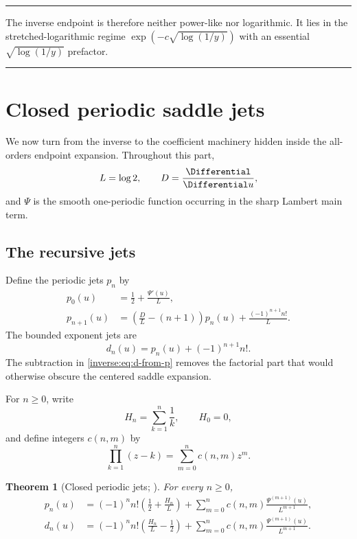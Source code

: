 \documentclass[11pt,oneside]{article}
\newtheorem{theorem}{Theorem}[section]
\theoremstyle{definition}
\theoremstyle{remark}
\newenvironment{boxedremark}{%
  \par\smallskip\noindent\begin{center}\begin{minipage}{0.94\textwidth}%
  \color{black}\hrule\vspace{0.6em}\small
}{%
  \vspace{0.6em}\hrule\end{minipage}\end{center}\smallskip
}
\begin{document}
\begin{boxedremark}
The inverse endpoint is therefore neither power-like nor logarithmic.
It lies in the stretched-logarithmic regime
$\exp(-c\sqrt{\log(1/y)})$ with an essential
$\sqrt{\log(1/y)}$ prefactor.
\end{boxedremark}

\section{Closed periodic saddle jets}
\label{inverse:sec:closed-jets}

We now turn from the inverse to the coefficient machinery hidden inside
the all-orders endpoint expansion.  Throughout this part,
\[
 L=\log2,\qquad D=\frac{\Differential}{\Differential u},
\]
and $\Psi$ is the smooth one-periodic function occurring in the sharp
Lambert main term.

\subsection{The recursive jets}

Define the periodic jets $p_n$ by
\begin{align}
 p_0(u)&=\frac12+\frac{\Psi'(u)}L, \label{inverse:eq:p0}\\
 p_{n+1}(u)
 &=\left(\frac DL-(n+1)\right)p_n(u)
   +\frac{(-1)^{n+1}n!}{L}. \label{inverse:eq:p-recurrence}
\end{align}
The bounded exponent jets are
\begin{equation}
 d_n(u)=p_n(u)+(-1)^{n+1}n!. \label{inverse:eq:d-from-p}
\end{equation}
The subtraction in \eqref{inverse:eq:d-from-p} removes the factorial part that
would otherwise obscure the centered saddle expansion.

For $n\geq0$, write
\[
 H_n=\sum_{k=1}^n\frac1k,\qquad H_0=0,
\]
and define integers $c(n,m)$ by
\begin{equation}
 \prod_{k=1}^n(z-k)=\sum_{m=0}^n c(n,m)z^m.
 \label{inverse:eq:c-definition}
\end{equation}

\begin{theorem}[Closed periodic jets; \Formalized]
\label{inverse:thm:closed-jets}
For every $n\geq0$,
\begin{align}
 p_n(u)
 &=
 (-1)^n n!\left(\frac12+\frac{H_n}{L}\right)
 +\sum_{m=0}^n
   c(n,m)\frac{\Psi^{(m+1)}(u)}{L^{m+1}},
 \label{inverse:eq:p-closed}\\
 d_n(u)
 &=
 (-1)^n n!\left(\frac{H_n}{L}-\frac12\right)
 +\sum_{m=0}^n
   c(n,m)\frac{\Psi^{(m+1)}(u)}{L^{m+1}}.
 \label{inverse:eq:d-closed}
\end{align}
\end{theorem}
\end{document}
